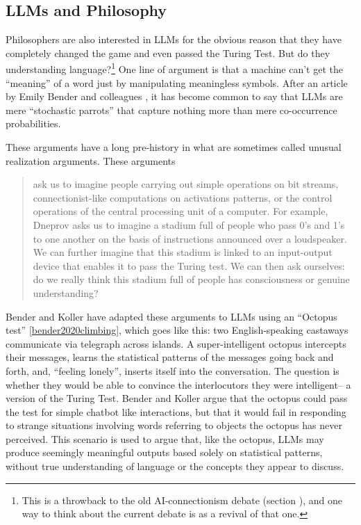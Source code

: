 \subsection{LLMs and Philosophy}\label{llmPhilosophy}

Philosophers are also interested in LLMs for the obvious reason that they have completely changed the game and even passed the Turing Test. But do they understanding language?\footnote{This is a throwback to the old AI-connectionism debate (section ), and one way to think about the current debate is as a revival of that one.} One line of argument is that a machine can’t get the ``meaning'' of a word just by manipulating meaningless symbols. After an article by Emily Bender and colleagues \cite{bender2021dangers}, it has become common to say that LLMs are mere ``stochastic parrots'' that capture nothing more than mere co-occurrence probabilities. 

These arguments have a long pre-history in what are sometimes called unusual realization arguments. These arguments
\begin{quote}
ask us to imagine people carrying out simple operations on bit streams, connectionist-like computations on activations patterns, or the control operations of the central processing unit of a computer. For example, Dneprov asks us to imagine a stadium full of people who pass 0’s and 1’s to one another on the basis of instructions announced over a loudspeaker. We can further imagine that this stadium is linked to an input-output device that enables it to pass the Turing test. We can then ask ourselves: do we really think this stadium full of people has consciousness or genuine understanding? \cite{noelle2022artificial}
\end{quote}

Bender and Koller have adapted these arguments to LLMs using an ``Octopus test'' \ref{bender2020climbing}, which goes like this: two English-speaking castaways communicate via telegraph across islands. A super-intelligent octopus intercepts their messages, learns the statistical patterns of the messages going back and forth, and, ``feeling lonely'', inserts itself into the conversation. The question is whether they would be able to convince the interlocutors they were intelligent-- a version of the Turing Test. Bender and Koller argue that the octopus could pass the test for simple chatbot like interactions, but that it would fail in responding to strange situations involving words referring to objects the octopus has never perceived. This scenario is used to argue that, like the octopus, LLMs may produce seemingly meaningful outputs based solely on statistical patterns, without true understanding of language or the concepts they appear to discuss.

